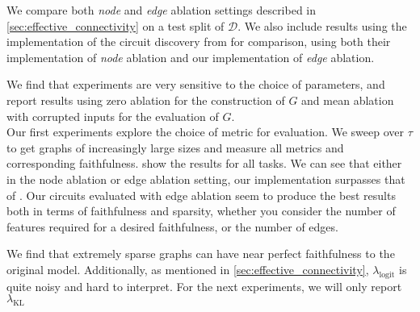 \documentclass{article}
\begin{document}
We compare both \emph{node} and \emph{edge} ablation settings described in \cref{sec:effective_connectivity} on a test split of $\mathcal{D}$. We also include results using the implementation of the circuit discovery from \citet{marks2024sparseCircuits} for comparison, using both their implementation of \emph{node} ablation and our implementation of \emph{edge} ablation.

We find that experiments are very sensitive to the choice of parameters, and report results using zero ablation for the construction of $G$ and mean ablation with corrupted inputs for the evaluation of $G$.\\

Our first experiments explore the choice of metric for evaluation. We sweep over $\tau$ to get graphs of increasingly large sizes and measure all metrics and corresponding faithfulness.  show the results for all tasks. We can see that either in the node ablation or edge ablation setting, our implementation surpasses that of \citet{marks2024sparseCircuits}. Our circuits evaluated with edge ablation seem to produce the best results both in terms of faithfulness and sparsity, whether you consider the number of features required for a desired faithfulness, or the number of edges.

We find that extremely sparse graphs can have near perfect faithfulness to the original model. Additionally, as mentioned in \cref{sec:effective_connectivity}, $\lambda_{\mathrm{logit}}$ is quite noisy and hard to interpret. For the next experiments, we will only report $\lambda_{\mathrm{KL}}$
\end{document}
